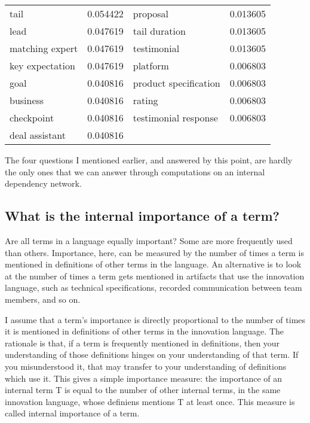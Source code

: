 \begin{longtable}{@{}llll@{}}
tail            & 0.054422                              & proposal                   & 0.013605                              \\
lead            & 0.047619                              & tail duration              & 0.013605                              \\
matching expert & 0.047619                              & testimonial                & 0.013605                              \\
key expectation & 0.047619                              & platform                   & 0.006803                              \\
goal            & 0.040816                              & product specification      & 0.006803                              \\
business        & 0.040816                              & rating                     & 0.006803                              \\
checkpoint      & 0.040816                              & testimonial response       & 0.006803                              \\
deal assistant  & 0.040816                              &                            &                                       \\* \bottomrule
\end{longtable}

The four questions I mentioned earlier, and answered by this point, are hardly the only ones that we can answer through computations on an internal dependency network.

\subsection{What is the internal importance of a term?}
\label{c7:s3:ss5}
Are all terms in a language equally important? Some are more frequently used than others. Importance, here, can be measured by the number of times a term is mentioned in definitions of other terms in the language. An alternative is to look at the number of times a term gets mentioned in artifacts that use the innovation language, such as technical specifications, recorded communication between team members, and so on.

I assume that a term's importance is directly proportional to the number of times it is mentioned in definitions of other terms in the innovation language. The rationale is that, if a term is frequently mentioned in definitions, then your understanding of those definitions hinges on your understanding of that term. If you misunderstood it, that may transfer to your understanding of definitions which use it. This gives a simple importance measure: the importance of an internal term T is equal to the number of other internal terms, in the same innovation language, whose definiens mentions T at least once. This measure is called internal importance of a term.

